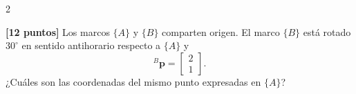 \documentclass[10pt]{article}
\begin{document}
\begin{multicols}{2}
\begin{question}
            \begin{answers}
            \end{answers}
        \end{question}


        \begin{question}
            \textbf{[12 puntos]} Los marcos $\{A\}$ y $\{B\}$ comparten origen. El marco
            $\{B\}$ está rotado $30^\circ$ en sentido antihorario respecto a $\{A\}$ y
            \[
            {}^B\mathbf{p}=\begin{bmatrix}2\\1\end{bmatrix}.
            \]
            ¿Cuáles son las coordenadas del mismo punto expresadas en $\{A\}$?

            \begin{answers}
            \end{answers}
        \end{question}


\end{multicols}
\end{document}
